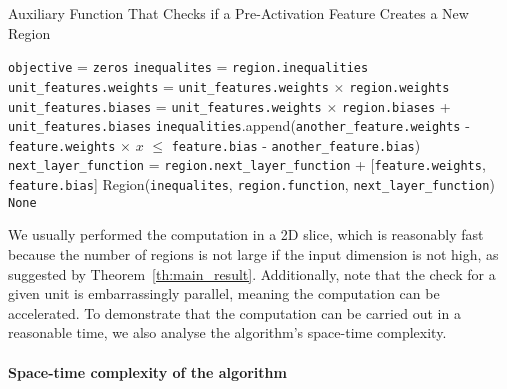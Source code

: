 \documentclass{article}
\theoremstyle{definition}
\begin{document}
\begin{algorithm}[t]
    \caption{Auxiliary Function That Checks if a Pre-Activation Feature Creates a New Region}
    \label{alg:feature_check}
    \begin{algorithmic}[1]
            \State \texttt{objective} = \texttt{zeros}
            \State \texttt{inequalites} = \texttt{region.inequalities}
            \State \texttt{unit\_features.weights} = \texttt{unit\_features.weights} $\times$ \texttt{region.weights}
            \State \texttt{unit\_features.biases} = \texttt{unit\_features.weights} $\times$ \texttt{region.biases}
            \State \hspace{22em} + \texttt{unit\_features.biases}
                \State \texttt{inequalities}.append(\texttt{another\_feature.weights} - \texttt{feature.weights} $\times$ $x$
                \State \hspace{15em} $\leq$ \texttt{feature.bias} - \texttt{another\_feature.bias})
            \EndFor
                \State \texttt{next\_layer\_function} = \texttt{region.next\_layer\_function}
                \State \hspace{15em} + [\texttt{feature.weights}, \texttt{feature.bias}]
                \State \Return Region(\texttt{inequalites}, \texttt{region.function}, \texttt{next\_layer\_function})
            \EndIf
            \State \Return \texttt{None}
        \EndFunction
    \end{algorithmic}
\end{algorithm}

We usually performed the computation in a 2D slice, which is reasonably fast because the number of regions is not large if the input dimension is not high, as suggested by Theorem~\ref{th:main_result}. 
Additionally, note that the check for a given unit is embarrassingly parallel, meaning the computation can be accelerated.
To demonstrate that the computation can be carried out in a reasonable time, we also analyse the algorithm's space-time complexity.

\paragraph{Space-time complexity of the algorithm}\mbox{}
\end{document}
